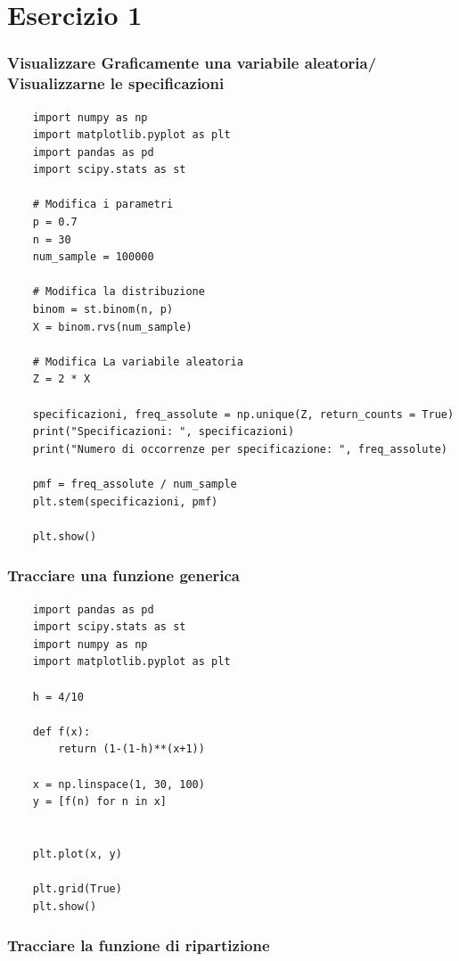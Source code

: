 \documentclass{article}
\begin{document}
\pagebreak

\section{Esercizio 1}

\subsubsection*{Visualizzare Graficamente una variabile aleatoria/ Visualizzarne le specificazioni}

\begin{lstlisting}
    import numpy as np
    import matplotlib.pyplot as plt
    import pandas as pd
    import scipy.stats as st

    # Modifica i parametri
    p = 0.7
    n = 30
    num_sample = 100000

    # Modifica la distribuzione
    binom = st.binom(n, p)
    X = binom.rvs(num_sample)

    # Modifica La variabile aleatoria
    Z = 2 * X

    specificazioni, freq_assolute = np.unique(Z, return_counts = True)
    print("Specificazioni: ", specificazioni)
    print("Numero di occorrenze per specificazione: ", freq_assolute)

    pmf = freq_assolute / num_sample
    plt.stem(specificazioni, pmf)

    plt.show()
\end{lstlisting}


\subsubsection*{Tracciare una funzione generica}

\begin{lstlisting}
    import pandas as pd
    import scipy.stats as st
    import numpy as np
    import matplotlib.pyplot as plt

    h = 4/10

    def f(x):
        return (1-(1-h)**(x+1))

    x = np.linspace(1, 30, 100)
    y = [f(n) for n in x]


    plt.plot(x, y)

    plt.grid(True)
    plt.show()
\end{lstlisting}

\pagebreak

\subsubsection*{Tracciare la funzione di ripartizione}
\end{document}
